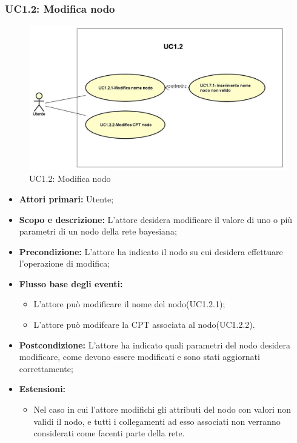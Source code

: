 \subsubsection{UC1.2: Modifica nodo} 
\begin{figure} [H]
	\centering
	\includegraphics[scale=0.45]{Img/UC1-2} 
	\caption{UC1.2: Modifica nodo} \label{} 
\end{figure} 
\begin{itemize} 
	\item{\textbf{Attori primari:} Utente;} 
	\item{\textbf{Scopo e descrizione:} L'attore desidera modificare il valore di uno o più parametri di un nodo della rete bayesiana;} 
	\item{\textbf{Precondizione:} L'attore ha indicato il nodo su cui desidera effettuare l'operazione di modifica;} 
	\item{\textbf{Flusso base degli eventi:} } 
		\begin{itemize} 
			\item{L'attore può modificare il nome del nodo(UC1.2.1);} 
			\item{L'attore può modifcare la CPT associata al nodo(UC1.2.2).} 		
		\end{itemize} 
	\item{\textbf{Postcondizione:} L'attore ha indicato quali parametri del nodo desidera modificare, come devono essere modificati e sono stati aggiornati correttamente;} 
	\item{\textbf{Estensioni:} } 
		\begin{itemize} 
			\item{Nel caso in cui l'attore modifichi gli attributi del nodo con valori non validi il nodo, e tutti i collegamenti ad esso associati non verranno considerati come facenti parte della rete.} 
		\end{itemize} 
\end{itemize} 
